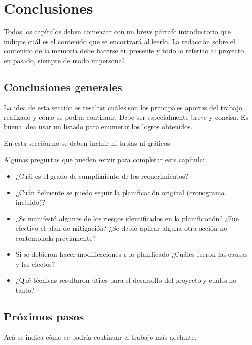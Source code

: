 
\chapter{Conclusiones} %

\label{Chapter5} %
Todos los capítulos deben comenzar con un breve párrafo introductorio que indique cuál es el contenido que se encontrará al leerlo.  La redacción sobre el contenido de la memoria debe hacerse en presente y todo lo referido al proyecto en pasado, siempre de modo impersonal.




\section{Conclusiones generales }

La idea de esta sección es resaltar cuáles son los principales aportes del trabajo realizado y cómo se podría continuar. Debe ser especialmente breve y concisa. Es buena idea usar un listado para enumerar los logros obtenidos.

En esta sección no se deben incluir ni tablas ni gráficos.

Algunas preguntas que pueden servir para completar este capítulo:

\begin{itemize}
\item ¿Cuál es el grado de cumplimiento de los requerimientos?
\item ¿Cuán fielmente se puedo seguir la planificación original (cronograma incluido)?
\item ¿Se manifestó algunos de los riesgos identificados en la planificación? ¿Fue efectivo el plan de mitigación? ¿Se debió aplicar alguna otra acción no contemplada previamente?
\item Si se debieron hacer modificaciones a lo planificado ¿Cuáles fueron las causas y los efectos?
\item ¿Qué técnicas resultaron útiles para el desarrollo del proyecto y cuáles no tanto?
\end{itemize}


\section{Próximos pasos}

Acá se indica cómo se podría continuar el trabajo más adelante.

